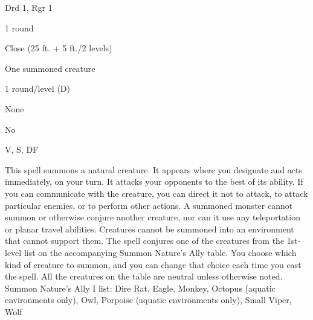 
\begin{description*}
\item[Level:] Drd 1, Rgr 1
\item[Casting Time:] 1 round
\item[Range:] Close (25 ft. + 5 ft./2 levels)
\item[Effect:] One summoned creature
\item[Duration:] 1 round/level (D)
\item[Saving Throw:] None
\item[Spell Resistance:] No
\item[Components:] V, S, DF
\end{description*}

This spell summons a natural creature. It appears where you designate and acts
immediately, on your turn. It attacks your opponents to the best of its ability.
If you can communicate with the creature, you can direct it not to attack, to attack
particular enemies, or to perform other actions.
A summoned monster cannot summon or otherwise conjure another creature, nor can
it use any teleportation or planar travel abilities. Creatures cannot be summoned
into an environment that cannot support them.
The spell conjures one of the creatures from the 1st-level list on the accompanying
Summon Nature's Ally table. You choose which kind of creature to summon, and you
can change that choice each time you cast the spell. All the creatures on the table
are neutral unless otherwise noted.
Summon Nature's Ally I list: Dire Rat, Eagle, Monkey, Octopus (aquatic environments only), Owl, Porpoise (aquatic environments only), Small Viper, Wolf